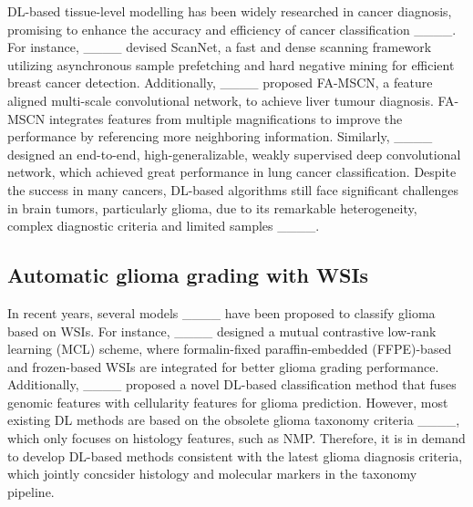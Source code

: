 DL-based tissue-level modelling has been widely researched in cancer diagnosis, promising to enhance the accuracy and efficiency of cancer classification ____. For instance, ____ devised ScanNet, a fast and dense scanning framework utilizing asynchronous sample prefetching and hard negative mining for efficient breast cancer detection. Additionally, ____ proposed FA-MSCN, a feature aligned multi-scale convolutional network, to achieve liver tumour diagnosis. FA-MSCN integrates features from multiple magnifications to improve the performance by referencing more neighboring information. Similarly, ____ designed an end-to-end, high-generalizable, weakly supervised deep convolutional network, which achieved great performance in lung cancer classification. Despite the success in many cancers, DL-based algorithms still face significant challenges in brain tumors, particularly glioma, due to its remarkable heterogeneity, complex diagnostic criteria and limited samples ____.



\subsection{Automatic glioma grading with WSIs}


In recent years, several models ____ have been proposed to classify glioma based on WSIs. For instance, ____ designed a mutual contrastive low-rank learning (MCL) scheme, where formalin-fixed paraffin-embedded (FFPE)-based  and frozen-based WSIs are integrated for better glioma grading performance. Additionally, ____ proposed a novel DL-based classification method that fuses genomic features with cellularity features for glioma prediction. However, most existing DL methods are based on the obsolete glioma taxonomy criteria ____, which only focuses on histology features, such as NMP. Therefore, it is in demand to develop DL-based methods consistent with the latest glioma diagnosis criteria, which jointly concsider histology and molecular markers in the taxonomy pipeline.



